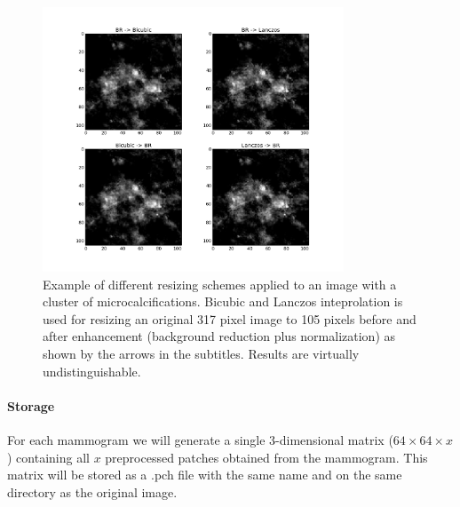 \begin{figure}
	\centering
	\includegraphics [width = 0.8\textwidth]{plots/mcDiffResizings.png}
	\caption[Example of resizing schemes]{Example of different resizing schemes applied to an image with a cluster of microcalcifications. Bicubic and Lanczos inteprolation is used for resizing an original 317 pixel image to 105 pixels before and after enhancement (background reduction plus normalization) as shown by the arrows in the subtitles. Results are virtually undistinguishable.}
	\label{fig:ResizingInterps}
\end{figure}

\paragraph{Storage}
For each mammogram we will generate a single 3-dimensional matrix ($64 \times 64 \times x$)  containing all $x$ preprocessed patches obtained from the mammogram. This matrix will be stored as a .pch file with the same name and on the same directory as the original image.
